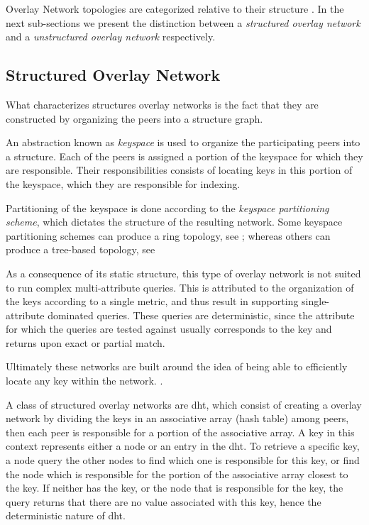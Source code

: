 \documentclass[12pt, titlepage]{uo_temp}
\begin{document}
     Overlay Network topologies are categorized relative to their structure
     \cite{lua2005survey}. In the next sub-sections we present the distinction between a
     \emph{structured overlay network} and a \emph{unstructured overlay network} respectively.

     \subsection{Structured Overlay Network}
     What characterizes structures overlay networks is the fact that they are constructed
     by organizing the peers into a structure graph. 

     An abstraction known as \emph{keyspace} is used to organize the participating peers
     into a structure. Each of the peers is assigned a portion of the keyspace for which
     they are responsible. Their responsibilities consists of locating keys in this
     portion of the keyspace, which they are responsible for indexing.
     
     Partitioning of the keyspace is done according to the \emph{keyspace partitioning
       scheme}, which dictates the structure of the resulting network. Some keyspace
     partitioning schemes can produce a ring topology, see \cite{stoica2001chord}; whereas
     others can produce a tree-based topology, see \cite{jagadish2005baton}
     
     As a consequence of its static structure, this type of overlay network is not suited
     to run complex multi-attribute queries. This is attributed to the organization of the
     keys according to a single metric, and thus result in supporting single-attribute
     dominated queries. These queries are deterministic, since the attribute for which the
     queries are tested against usually corresponds to the key and returns upon exact or
     partial match.

     Ultimately these networks are built around the idea of being able to efficiently
     locate any key within the network. .
     
     A class of structured overlay networks are \gls{dht}, which consist of creating a
     overlay network by dividing the keys in an associative array (hash table) among
     peers, then each peer is responsible for a portion of the associative array. A key in
     this context represents either a node or an entry in the \gls{dht}.  To retrieve a
     specific key, a node query the other nodes to find which one is responsible for this
     key, or find the node which is responsible for the portion of the associative array
     closest to the key. If neither has the key, or the node that is responsible for the
     key, the query returns that there are no value associated with this key, hence the
     deterministic nature of \gls{dht}.
\end{document}
